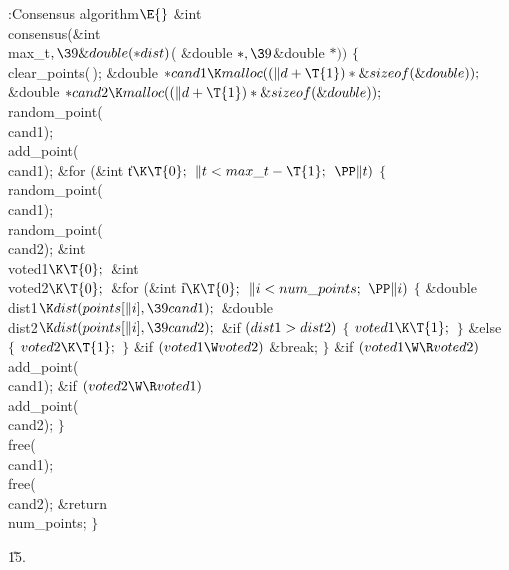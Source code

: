 \Y\B\4:Consensus algorithm\X${}\E{}$\6
\&{int} \\{consensus}(\&{int} \\{max\_t}${},\39\&{double}({*}\\{dist}){}$(%
\&{double} ${}{*},\39{}$\&{double} ${}{*})){}$\1\1\2\2\6
${}\{{}$\1\6
\\{clear\_points}(\,);\7
\&{double} ${}{*}\\{cand1}\K\\{malloc}((\|d+\T{1})*\&{sizeof}(\&{double}));{}$\6
\&{double} ${}{*}\\{cand2}\K\\{malloc}((\|d+\T{1})*\&{sizeof}(\&{double}));{}$\7
\\{random\_point}(\\{cand1});\6
\\{add\_point}(\\{cand1});\6
\&{for} (\&{int} \|t${}\K\T{0};{}$ ${}\|t<\\{max\_t}-\T{1};{}$ ${}\PP\|t){}$\5
${}\{{}$\1\6
\\{random\_point}(\\{cand1});\6
\\{random\_point}(\\{cand2});\7
\&{int} \\{voted1}${}\K\T{0};{}$\6
\&{int} \\{voted2}${}\K\T{0};{}$\7
\&{for} (\&{int} \|i${}\K\T{0};{}$ ${}\|i<\\{num\_points};{}$ ${}\PP\|i){}$\5
${}\{{}$\1\6
\&{double} \\{dist1}${}\K\\{dist}(\\{points}[\|i],\39\\{cand1});{}$\6
\&{double} \\{dist2}${}\K\\{dist}(\\{points}[\|i],\39\\{cand2});{}$\7
\&{if} ${}(\\{dist1}>\\{dist2}){}$\5
${}\{{}$\1\6
${}\\{voted1}\K\T{1};{}$\6
\4${}\}{}$\2\6
\&{else}\5
${}\{{}$\1\6
${}\\{voted2}\K\T{1};{}$\6
\4${}\}{}$\2\6
\&{if} ${}(\\{voted1}\W\\{voted2}){}$\1\5
\&{break};\2\6
\4${}\}{}$\2\6
\&{if} ${}(\\{voted1}\W\R\\{voted2}){}$\1\5
\\{add\_point}(\\{cand1});\2\6
\&{if} ${}(\\{voted2}\W\R\\{voted1}){}$\1\5
\\{add\_point}(\\{cand2});\2\6
\4${}\}{}$\2\6
\\{free}(\\{cand1});\6
\\{free}(\\{cand2});\6
\&{return} \\{num\_points};\6
\4${}\}{}$\2\par
\U15.\fi

